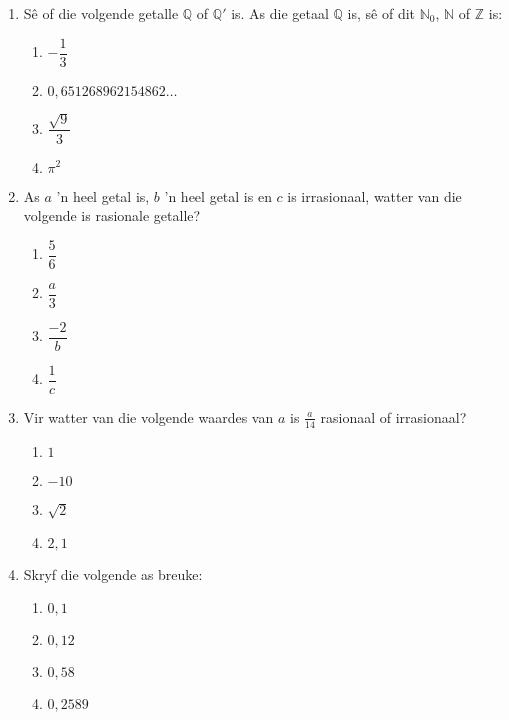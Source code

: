 \begin{exercises}{}{
\begin{enumerate}[itemsep=5pt, label=\textbf{\arabic*}. ] 
\item Sê of die volgende getalle $\mathbb{Q}$ of $\mathbb{Q'}$ is. As die getaal $\mathbb{Q}$ is, sê of dit $\mathbb{N}_0$, $\mathbb{N}$ of $\mathbb{Z}$ is:
\begin{enumerate}[itemsep=5pt, label=\textbf{(\alph*)} ] 
    \item $-\dfrac{1}{3}$
    \item $0,651268962154862\ldots$
    \item $\dfrac{\sqrt{9}}{3}$
    \item $\pi^2$
\end{enumerate}
\item As $a$ 'n heel getal is, $b$ 'n heel getal is en $c$ is irrasionaal, watter van die volgende is rasionale getalle? 
  \begin{enumerate}[itemsep=5pt, label=\textbf{\alph*}. ] 
    \item $\dfrac{5}{6}$
    \item $\dfrac{a}{3}$
    \item $\dfrac{-2}{b}$
    \item $\dfrac{1}{c}$
    \end{enumerate}
\item Vir watter van die volgende waardes van $a$ is $\frac{a}{14}$ rasionaal of irrasionaal?
    \begin{enumerate}[itemsep=5pt, label=\textbf{\alph*}. ] 
    \item $1$
    \item $-10$
    \item $\sqrt{2}$
    \item $2,1$
    \end{enumerate}

\item Skryf die volgende as breuke:
    \begin{enumerate}[itemsep=5pt, label=\textbf{\alph*}. ] 
    \item $0,1$
    \item $0,12$
    \item $0,58$
    \item $0,2589$
    \end{enumerate}


\end{enumerate}}
\end{exercises}
